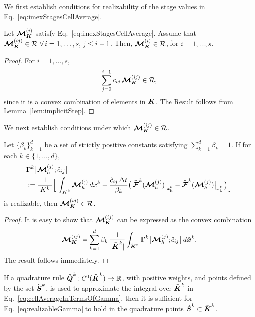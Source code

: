 We first establish conditions for realizability of the stage values in Eq.~\eqref{eq:imexStagesCellAverage}.  
\begin{lemma}
  Let $\boldsymbol{\mathcal{M}}_{\boldsymbol{K}}^{(i)}$ satisfy Eq.~\eqref{eq:imexStagesCellAverage}.
  Assume that $\boldsymbol{\mathcal{M}}_{\boldsymbol{K}}^{(ij)}\in\mathcal{R}~\forall\,i=1,\ldots,s,\,j\le i-1$.  
  Then, $\boldsymbol{\mathcal{M}}_{\boldsymbol{K}}^{(i)}\in\mathcal{R}$, for $i=1,\ldots,s$.  
  \label{lem:imexStagesCellAverage}
\end{lemma}
\begin{proof}
  For $i=1,\ldots,s$, 
  \begin{equation*}
    \sum_{j=0}^{i-1}c_{ij}\,\boldsymbol{\mathcal{M}}_{\boldsymbol{K}}^{(ij)}\in\mathcal{R},
  \end{equation*}
  since it is a convex combination of elements in $\boldsymbol{K}$.  
  The Result follows from Lemma~\ref{lem:implicitStep}.  
\end{proof}

We next establish conditions under which $\boldsymbol{\mathcal{M}}_{\boldsymbol{K}}^{(ij)}\in\mathcal{R}$.  
\begin{lemma}
  Let $\{\beta_{k}\}_{k=1}^{d}$ be a set of strictly positive constants satisfying $\sum_{k=1}^{d}\beta_{k}=1$.  
  If for each $k\in\{1,\ldots,d\}$, 
  \begin{align}
    &\boldsymbol{\Gamma}^{k}\big[\boldsymbol{\mathcal{M}}_{h}^{(j)};\hat{c}_{ij}\big] \label{eq:realizableGamma} \\
    &:=\frac{1}{|K^{k}|}
    \Big[\,\int_{K^{k}}\boldsymbol{\mathcal{M}}_{h}^{(j)}\,dx^{k}-\frac{\hat{c}_{ij}\,\Delta t}{\beta_{k}}\big(\,\widehat{\boldsymbol{\mathcal{F}}}^{k}(\boldsymbol{\mathcal{M}}_{h}^{(j)})\big|_{x_{\textnormal{\tiny\textsc{H}}}^{k}}-\widehat{\boldsymbol{\mathcal{F}}}^{k}(\boldsymbol{\mathcal{M}}_{h}^{(j)})\big|_{x_{\textnormal{\tiny\textsc{L}}}^{k}}\,\big)\,\Big] \nonumber    
  \end{align}
  is realizable, then $\boldsymbol{\mathcal{M}}_{\boldsymbol{K}}^{(ij)}\in\mathcal{R}$.  
  \label{lem:realizableMij}
\end{lemma}
\begin{proof}
  It is easy to show that $\boldsymbol{\mathcal{M}}_{\boldsymbol{K}}^{(ij)}$ can be expressed as the convex combination
  \begin{equation}
    \boldsymbol{\mathcal{M}}_{\boldsymbol{K}}^{(ij)}
    =\sum_{k=1}^{d}\beta_{k}\,\frac{1}{|\tilde{\boldsymbol{\boldsymbol{K}}}^{k}|}\int_{\tilde{\boldsymbol{K}}^{k}}\boldsymbol{\Gamma}^{k}\big[\boldsymbol{\mathcal{M}}_{h}^{(j)};\hat{c}_{ij}\big]\,d\tilde{\boldsymbol{x}}^{k}.  
    \label{eq:cellAverageInTermsOfGamma}
  \end{equation}
  The result follows immediately.  
\end{proof}
\begin{rem}
  If a quadrature rule $\tilde{\boldsymbol{Q}}^{k}\colon C^{0}(\tilde{\boldsymbol{K}}^{k})\to\mathbb{R}$, with positive weights, and points defined by the set $\tilde{\boldsymbol{S}}^{k}$, is used to approximate the integral over $\tilde{\boldsymbol{K}}^{k}$ in Eq.~\eqref{eq:cellAverageInTermsOfGamma}, then it is sufficient for Eq.~\eqref{eq:realizableGamma} to hold in the quadrature points $\tilde{\boldsymbol{S}}^{k}\subset\tilde{\boldsymbol{K}}^{k}$.  
\end{rem}

